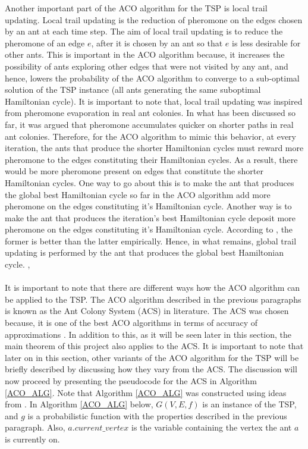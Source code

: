 \documentclass{article}
\begin{document}
Another important part of the ACO algorithm for the TSP is local trail updating. Local trail updating is the reduction of pheromone on the edges chosen by an ant at each time step. The aim of local trail updating is to reduce the pheromone of an edge $e$, after it is chosen by an ant so that $e$ is less desirable for other ants. This is important in the ACO algorithm because, it increases the possibility of ants exploring other edges that were not visited by any ant, and hence, lowers the probability of the ACO algorithm to converge to a sub-optimal solution of the TSP instance (all ants generating the same suboptimal Hamiltonian cycle). It is important to note that, local trail updating was inspired from pheromone evaporation in real ant colonies. In what has been discussed so far, it was argued that pheromone accumulates quicker on shorter paths in real ant colonies. Therefore, for the ACO algorithm to mimic this behavior, at every iteration, the ants that produce the shorter Hamiltonian cycles must reward more pheromone to the edges constituting their Hamiltonian cycles. As a result, there would be more pheromone present on edges that constitute the shorter Hamiltonian cycles. One way to go about this is to make the ant that produces the global best Hamiltonian cycle so far in the ACO algorithm add more pheromone on the edges constituting it's Hamiltonian cycle. Another way is to make the ant that produces the iteration's best Hamiltonian cycle deposit more pheromone on the edges constituting it's Hamiltonian cycle. According to \cite{dorigo_stutzle_thomas_2004}, the former is better than the latter empirically. Hence, in what remains, global trail updating is performed by the ant that produces the global best Hamiltonian cycle. \cite{dorigo_gambardella_1997}, \cite{dorigo_stutzle_thomas_2004} \\\\
It is important to note that there are different ways how the ACO algorithm can be applied to the TSP. The ACO algorithm described in the previous paragraphs is known as the Ant Colony System (ACS) in literature. The ACS was chosen because, it is one of the best ACO algorithms in terms of accuracy of approximations \cite{dorigo_stutzle_thomas_2004}. In addition to this, as it will be seen later in this section, the main theorem of this project also applies to the ACS. It is important to note that later on in this section, other variants of the ACO algorithm for the TSP will be briefly described by discussing how they vary from the ACS. The discussion will now proceed by presenting the pseudocode for the ACS in Algorithm \ref{ACO_ALG}. Note that Algorithm \ref{ACO_ALG} was constructed using ideas from \cite{dorigo_gambardella_1997}. In Algorithm \ref{ACO_ALG} below, $G(V,E,f)$ is an instance of the TSP, and $g$ is a probabilistic function with the properties described in the previous paragraph. Also, $a.current\_vertex$ is the variable containing the vertex the ant $a$ is currently on.
\end{document}

